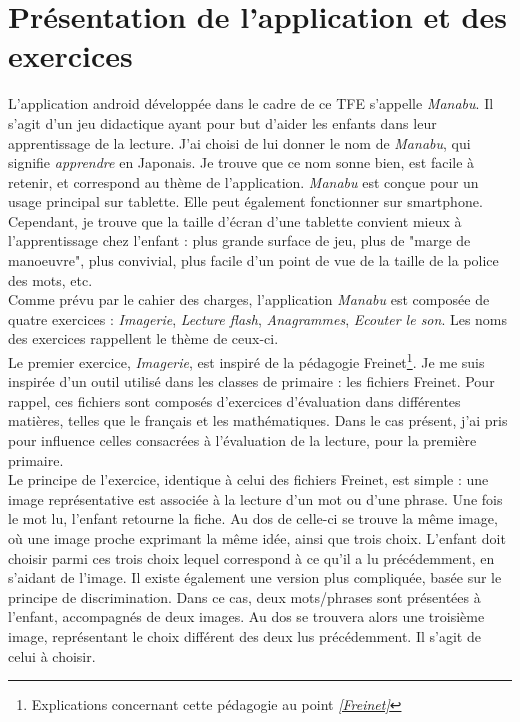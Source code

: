 \section{Présentation de l'application et des exercices}
L'application android développée dans le cadre de ce TFE s'appelle \textit{Manabu}. Il s'agit d'un jeu didactique ayant pour but d'aider les enfants dans leur apprentissage de la lecture. J'ai choisi de lui donner le nom de \textit{Manabu}, qui signifie \textit{apprendre} en Japonais. Je trouve que ce nom sonne bien, est facile à retenir, et correspond au thème de l'application. 
\textit{Manabu} est conçue pour un usage principal sur tablette. Elle peut également fonctionner sur smartphone. Cependant, je trouve que la taille d'écran d'une tablette convient mieux à l'apprentissage chez l'enfant : plus grande surface de jeu, plus de "marge de manoeuvre", plus convivial, plus facile d'un point de vue de la taille de la police des mots, etc.\\

Comme prévu par le cahier des charges, l'application \textit{Manabu} est composée de quatre exercices : \textit{Imagerie}, \textit{Lecture flash}, \textit{Anagrammes}, \textit{Ecouter le son}. Les noms des exercices rappellent le thème de ceux-ci.\\

Le premier exercice, \textit{Imagerie}, est inspiré de la pédagogie Freinet\footnote{Explications concernant cette pédagogie au point \textit{\ref{Freinet}}}. Je me suis inspirée d'un outil utilisé dans les classes de primaire : les fichiers Freinet. Pour rappel, ces fichiers sont composés d'exercices d'évaluation dans différentes matières, telles que le français et les mathématiques. Dans le cas présent, j'ai pris pour influence celles consacrées à l'évaluation de la lecture, pour la première primaire.\\

Le principe de l'exercice, identique à celui des fichiers Freinet, est simple : une image représentative est associée à la lecture d'un mot ou d'une phrase. Une fois le mot lu, l'enfant retourne la fiche. Au dos de celle-ci se trouve la même image, où une image proche exprimant la même idée, ainsi que trois choix. L'enfant doit choisir parmi ces trois choix lequel correspond à ce qu'il a lu précédemment, en s'aidant de l'image. Il existe également une version plus compliquée, basée sur le principe de discrimination. Dans ce cas, deux mots/phrases sont présentées à l'enfant, accompagnés de deux images. Au dos se trouvera alors une troisième image, représentant le choix différent des deux lus précédemment. Il s'agit de celui à choisir.\\

